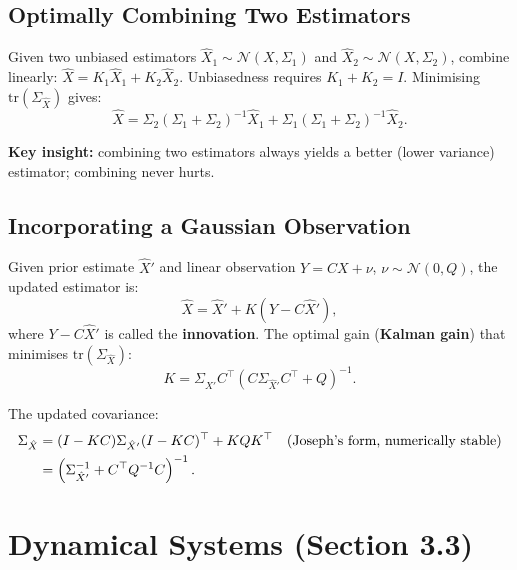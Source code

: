 \documentclass[12pt, a4paper]{article}
\begin{document}
\subsection{Optimally Combining Two Estimators}

Given two unbiased estimators $\hat{X}_1\sim\mathcal{N}(X,\Sigma_1)$
and $\hat{X}_2\sim\mathcal{N}(X,\Sigma_2)$, combine linearly:
$\hat{X}=K_1\hat{X}_1+K_2\hat{X}_2$.
Unbiasedness requires $K_1+K_2=I$.
Minimising $\mathrm{tr}(\Sigma_{\hat{X}})$ gives:
\begin{equation}
  \hat{X} = \Sigma_2(\Sigma_1+\Sigma_2)^{-1}\hat{X}_1
           + \Sigma_1(\Sigma_1+\Sigma_2)^{-1}\hat{X}_2.
  \label{eq:opt_combine}
\end{equation}

\textbf{Key insight:} combining two estimators always yields a better
(lower variance) estimator; combining never hurts.

\subsection{Incorporating a Gaussian Observation}

Given prior estimate $\hat{X}'$ and linear observation
$Y=CX+\nu$, $\nu\sim\mathcal{N}(0,Q)$, the updated estimator is:
\begin{equation}
  \hat{X} = \hat{X}' + K(Y - C\hat{X}'),
  \label{eq:update}
\end{equation}
where $Y-C\hat{X}'$ is called the \textbf{innovation}. The optimal
gain (\textbf{Kalman gain}) that minimises $\mathrm{tr}(\Sigma_{\hat{X}})$:
\begin{equation}
  \boxed{K = \Sigma_{\hat{X}'} C^\top (C\Sigma_{\hat{X}'} C^\top + Q)^{-1}.}
  \label{eq:Kgain}
\end{equation}

The updated covariance:
\begin{align}
  \Sigma_{\hat{X}} &= (I-KC)\Sigma_{\hat{X}'}(I-KC)^\top + KQK^\top
  \quad\text{(Joseph's form, numerically stable)} \notag\\
  &= \left(\Sigma_{\hat{X}'}^{-1} + C^\top Q^{-1}C\right)^{-1}.
  \label{eq:Sigma_update}
\end{align}

\section{Dynamical Systems (Section 3.3)}
\end{document}
